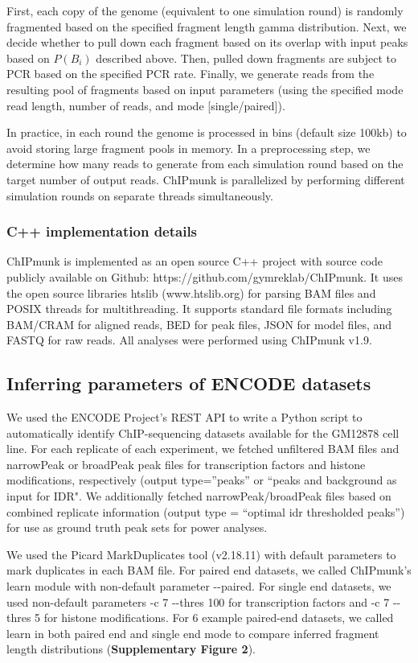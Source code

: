 \documentclass[12pt]{article}
\begin{document}
First, each copy of the genome (equivalent to one simulation round) is randomly fragmented based on the specified fragment length gamma distribution.
Next, we decide whether to pull down each fragment based on its overlap with input peaks based on $P(B_i)$ described above.
Then, pulled down fragments are subject to PCR based on the specified PCR rate.
Finally, we generate reads from the resulting pool of fragments based on input parameters (using the specified mode read length, number of reads, and mode [single/paired]).

In practice, in each round the genome is processed in bins (default size 100kb) to avoid storing large fragment pools in memory.
In a preprocessing step, we determine how many reads to generate from each simulation round based on the target number of output reads.
ChIPmunk is parallelized by performing different simulation rounds on separate threads simultaneously.

\subsubsection*{C++ implementation details}
ChIPmunk is implemented as an open source C++ project with source code publicly available on Github: https://github.com/gymreklab/ChIPmunk.
It uses the open source libraries htslib (www.htslib.org) for parsing BAM files and POSIX threads for multithreading.
It supports standard file formats including BAM/CRAM for aligned reads, BED for peak files, JSON for model files, and FASTQ for raw reads.
All analyses were performed using ChIPmunk v1.9.

\subsection*{Inferring parameters of ENCODE datasets}

We used the ENCODE Project's REST API to write a Python script to automatically identify ChIP-sequencing datasets available for the GM12878 cell line.
For each replicate of each experiment, we fetched unfiltered BAM files and narrowPeak or broadPeak peak files for transcription factors and histone modifications, respectively (output type=''peaks'' or ``peaks and background as input for IDR".
We additionally fetched narrowPeak/broadPeak files based on combined replicate information (output type = ``optimal idr thresholded peaks'') for use as ground truth peak sets for power analyses.

We used the Picard \cite{picard} MarkDuplicates tool (v2.18.11) with default parameters to mark duplicates in each BAM file.
For paired end datasets, we called ChIPmunk's learn module with non-default parameter -{}-paired.
For single end datasets, we used non-default parameters -c 7 -{}-thres 100 for transcription factors and -c 7 -{}-thres 5 for histone modifications.
For 6 example paired-end datasets, we called learn in both paired end and single end mode to compare inferred fragment length distributions (\textbf{Supplementary Figure 2}).
\end{document}
